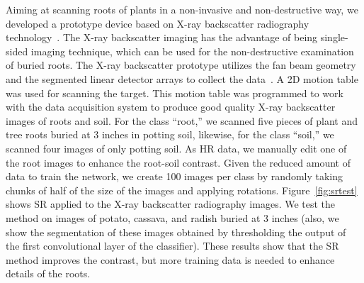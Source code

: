 \documentclass[10pt,twocolumn,letterpaper]{article}
\begin{document}
Aiming at scanning roots of plants in a non-invasive and non-destructive way, we developed a prototype device based on X-ray backscatter radiography technology~\cite{Kelley2019}. The X-ray backscatter imaging has the advantage of being single-sided imaging technique, which can be used for the non-destructive examination of buried roots. The X-ray backscatter prototype utilizes the fan beam geometry and the segmented linear detector arrays to collect the data~\cite{Cui2017}. A 2D motion table was used for scanning the target. This motion table was programmed to work with the data acquisition system to produce good quality X-ray backscatter images of roots and soil. For the class ``root,'' we scanned five pieces of plant and tree roots buried at 3 inches in potting soil, likewise, for the class ``soil,'' we scanned four images of only potting soil. As HR data, we manually edit one of the root images to enhance the root-soil contrast. Given the reduced amount of data to train the network, we create 100 images per class by randomly taking chunks of half of the size of the images and applying rotations. Figure~\ref{fig:srtest} shows SR applied to the X-ray backscatter radiography images. We test the method on images of potato, cassava, and radish buried at 3 inches (also, we show the segmentation of these images obtained by thresholding the output of the first convolutional layer of the classifier). These results show that the SR method improves the contrast, but more training data is needed to enhance details of the roots.
\end{document}
